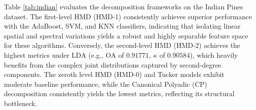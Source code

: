 \documentclass[12pt,onecolumn]{article}
\begin{document}
Table \ref{tab:indian} evaluates the decomposition frameworks on the Indian Pines dataset. The first-level HMD (HMD-1) consistently achieves superior performance with the AdaBoost, SVM, and KNN classifiers, indicating that isolating linear spatial and spectral variations yields a robust and highly separable feature space for these algorithms. Conversely, the second-level HMD (HMD-2) achieves the highest metrics under LDA (e.g., OA of $0.91771$, $\kappa$ of $0.90584$), which heavily benefits from the complex joint distributions captured by second-degree components. The zeroth level HMD (HMD-0) and Tucker models exhibit moderate baseline performance, while the Canonical Polyadic (CP) decomposition consistently yields the lowest metrics, reflecting its structural bottleneck.

\end{document}
